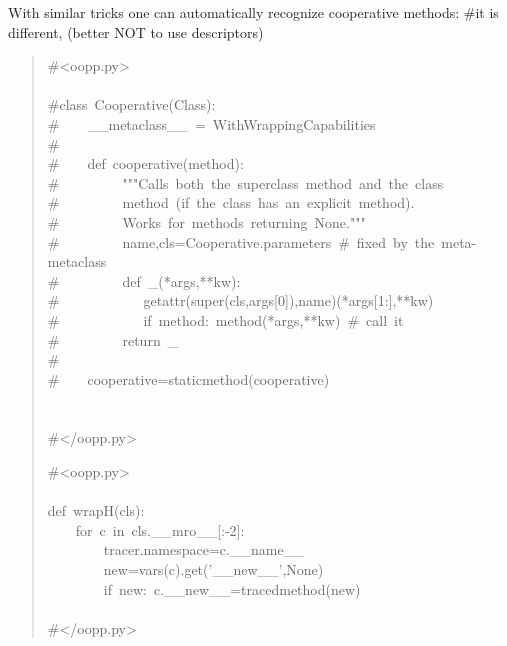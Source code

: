 \documentclass[10pt,english]{article}
\begin{document}
With similar tricks one can automatically recognize cooperative methods:
{\#}it is different, (better NOT to use descriptors)
\begin{quote}
\begin{ttfamily}\begin{flushleft}
\mbox{{\#}<oopp.py>}\\
\mbox{}\\
\mbox{{\#}class~Cooperative(Class):}\\
\mbox{{\#}~~~~{\_}{\_}metaclass{\_}{\_}~=~WithWrappingCapabilities}\\
\mbox{{\#}}\\
\mbox{{\#}~~~~def~cooperative(method):}\\
\mbox{{\#}~~~~~~~~~"""Calls~both~the~superclass~method~and~the~class}\\
\mbox{{\#}~~~~~~~~~method~(if~the~class~has~an~explicit~method).~}\\
\mbox{{\#}~~~~~~~~~Works~for~methods~returning~None."""}\\
\mbox{{\#}~~~~~~~~~name,cls=Cooperative.parameters~{\#}~fixed~by~the~meta-metaclass}\\
\mbox{{\#}~~~~~~~~~def~{\_}(*args,**kw):}\\
\mbox{{\#}~~~~~~~~~~~~getattr(super(cls,args[0]),name)(*args[1:],**kw)~}\\
\mbox{{\#}~~~~~~~~~~~~if~method:~method(*args,**kw)~{\#}~call~it}\\
\mbox{{\#}~~~~~~~~~return~{\_}}\\
\mbox{{\#}~~~~}\\
\mbox{{\#}~~~~cooperative=staticmethod(cooperative)}\\
\mbox{}\\
\mbox{}\\
\mbox{{\#}</oopp.py>}
\end{flushleft}\end{ttfamily}
\begin{ttfamily}\begin{flushleft}
\mbox{{\#}<oopp.py>}\\
\mbox{}\\
\mbox{def~wrapH(cls):}\\
\mbox{~~~~for~c~in~cls.{\_}{\_}mro{\_}{\_}[:-2]:}\\
\mbox{~~~~~~~~tracer.namespace=c.{\_}{\_}name{\_}{\_}}\\
\mbox{~~~~~~~~new=vars(c).get('{\_}{\_}new{\_}{\_}',None)}\\
\mbox{~~~~~~~~if~new:~c.{\_}{\_}new{\_}{\_}=tracedmethod(new)}\\
\mbox{}\\
\mbox{{\#}</oopp.py>}
\end{flushleft}\end{ttfamily}
\end{quote}
\end{document}
